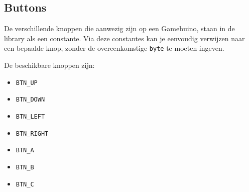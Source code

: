 \documentclass[a4paper,titlepage,12pt]{article}
\begin{document}
	\subsection{Buttons}
	De verschillende knoppen die aanwezig zijn op een Gamebuino, staan in de library als een constante. Via deze constantes kan je eenvoudig verwijzen naar een bepaalde knop, zonder de overeenkomstige \texttt{byte} te moeten ingeven.
	
	De beschikbare knoppen zijn:
	\begin{multicols}{4}
		\begin{itemize}
			\item \texttt{BTN\_UP}
			\item \texttt{BTN\_DOWN}
			\item \texttt{BTN\_LEFT}
			\item \texttt{BTN\_RIGHT}
			\item \texttt{BTN\_A}
			\item \texttt{BTN\_B}
			\item \texttt{BTN\_C}
		\end{itemize}
	\end{multicols}
\end{document}
